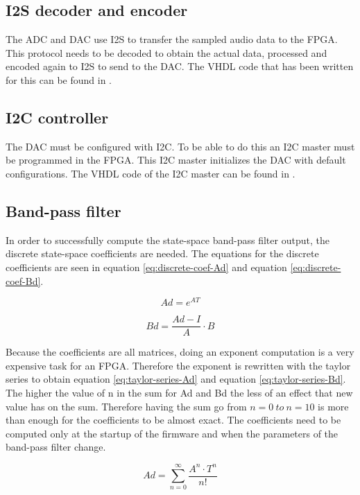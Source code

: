 \subsection{I2S decoder and encoder}
The ADC and DAC use I2S to transfer the sampled audio data to the FPGA. This protocol needs to be decoded to obtain the actual data, processed and encoded again to I2S to send to the DAC. The VHDL code that has been written for this can be found in . 

\subsection{I2C controller}
The DAC must be configured with I2C. To be able to do this an I2C master must be programmed in the FPGA. This I2C master initializes the DAC with default configurations. The VHDL code of the I2C master can be found in . 

\subsection{Band-pass filter}
In order to successfully compute the state-space band-pass filter output, the discrete state-space coefficients are needed. The equations for the discrete coefficients are seen in equation \ref{eq:discrete-coef-Ad} and equation \ref{eq:discrete-coef-Bd}.

\begin{equation}
    Ad=e^{AT}
    \label{eq:discrete-coef-Ad}
\end{equation}

\begin{equation}
    Bd=\frac{Ad-I}{A}\cdot B
    \label{eq:discrete-coef-Bd}
\end{equation}

Because the coefficients are all matrices, doing an exponent computation is a very expensive task for an FPGA. Therefore the exponent is rewritten with the taylor series to obtain equation \ref{eq:taylor-series-Ad} and equation \ref{eq:taylor-series-Bd}. The higher the value of n in the sum for Ad and Bd the less of an effect that new value has on the sum. Therefore having the sum go from $n=0\ to\ n=10$ is more than enough for the coefficients to be almost exact. The coefficients need to be computed only at the startup of the firmware and when the parameters of the band-pass filter change. 

\begin{equation}
    Ad=\sum_{n=0}^{\infty}\frac{A^n\cdot T^n}{n!}
    \label{eq:taylor-series-Ad}
\end{equation}

